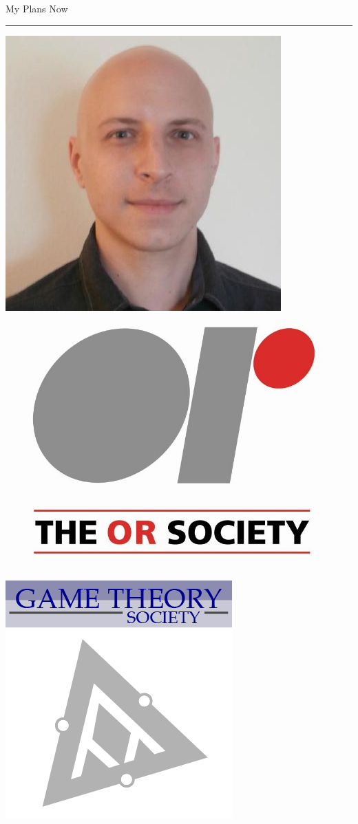 \documentclass{beamer}
\begin{document}
\begin{frame}{My Plans Now}
\begin{center}
        \rule{\textwidth}{2pt}
        \vspace{5pt}

        \includegraphics[height=0.15\textheight]{static/marc.jpeg}
        \hspace{1.85cm}
        \includegraphics[height=0.2\textheight]{static/or-society-logo.jpg}
        \hspace{1.5cm}
        \includegraphics[height=0.2\textheight]{static/game-society.png}



\end{center}
\end{frame}
\end{document}
